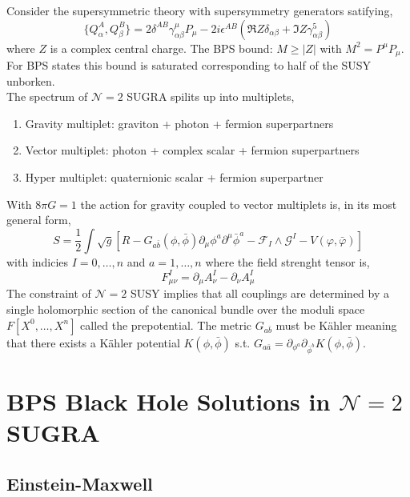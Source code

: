 \documentclass[12pt]{extarticle}
\begin{document}
Consider the supersymmetric theory with supersymmetry generators satifying,
\[ \{ Q_\alpha^A, Q_\beta^B \} = 2 \delta^{AB} \gamma^\mu_{\alpha \beta} P_\mu - 2 i \epsilon^{AB} (\Re{Z} \delta_{\alpha \beta} + \Im{Z} \gamma^5_{\alpha \beta}) \]
where $Z$ is a complex central charge.
The BPS bound: $M \ge |Z|$ with $M^2 = P^\mu P_\mu$. For BPS states this bound is saturated corresponding to half of the SUSY unborken. 
\bigskip\\
The spectrum of $\mathcal{N} = 2$ SUGRA spilits up into multiplets,
\begin{enumerate}
\item Gravity multiplet: graviton + photon + fermion superpartners
\item Vector multiplet: photon + complex scalar + fermion superpartners
\item Hyper multiplet: quaternionic scalar + fermion superpartner
\end{enumerate}
With $8 \pi G = 1$ the action for gravity coupled to vector multiplets is, in its most general form,
\[ S = \frac{1}{2} \int \sqrt{g} \left[ R - G_{a\bar{b}} (\phi, \bar{\phi}) \partial_\mu \phi^a \partial^\mu \bar{\phi}^a - \mathcal{F}_I \wedge \mathcal{G}^I - V(\varphi, \bar{\varphi}) \right] \]
with indicies $I = 0,\dots,n$ and $a = 1, \dots, n$
where the field strenght tensor is,
\[ F^I_{\mu \nu} = \partial_\mu A^I_\nu - \partial_\nu A_\mu^I \]
The constraint of $\mathcal{N} = 2$ SUSY implies that all couplings are determined by a single holomorphic section of the canonical bundle over the moduli space $F[X^0, \dots, X^n]$ called the prepotential. The metric $G_{a \bar{b}}$ must be K\"{a}hler meaning that there exists a K\"{a}hler potential $K(\phi, \bar{\phi})$ s.t. $G_{a \bar{a}} = \partial_{\phi^a} \partial_{\bar{\phi}^b} K(\phi, \bar{\phi})$. 

\section{BPS Black Hole Solutions in $\mathcal{N} = 2$ SUGRA}

\subsection{Einstein-Maxwell}
\end{document}
